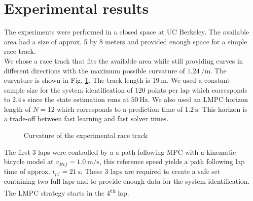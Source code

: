 \section{Experimental results}
The experiments were performed in a closed space at UC Berkeley. The available area had a size of approx. 5 by 8 meters and provided enough space for a simple race track.\\
We chose a race track that fits the available area while still providing curves in different directions with the maximum possible curvature of $\SI{1.24}{\per\meter}$. The curvature is shown in Fig. \ref{fig:exp_curv}. The track length is $\SI{19}{\meter}$.
We used a constant sample size for the system identification of 120 points per lap which corresponds to $\SI{2.4}{\second}$ since the state estimation runs at $\SI{50}{\hertz}$. We also used an LMPC horizon length of $N=12$ which corresponds to a prediction time of $\SI{1.2}{\second}$. This horizon is a trade-off between fast learning and fast solver times.
\begin{figure}[ht]
    \centering
      
    \caption{Curvature of the experimental race track}
    \label{fig:exp_curv}
\end{figure}

The first 3 laps were controlled by a a path following MPC with a kinematic bicycle model at $v_{Ref}=\SI{1.0}{\meter\per\second}$, this reference speed yields a path following lap time of approx. $t_{pf}=\SI{21}{\second}$. These 3 laps are required to create a safe set containing two full laps and to provide enough data for the system identification. The LMPC strategy starts in the 4\textsuperscript{th} lap.

